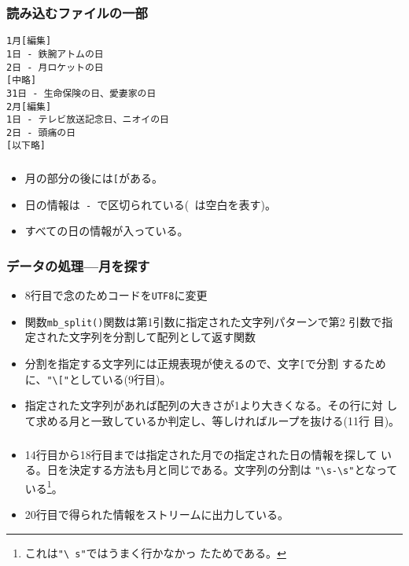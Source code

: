 \begin{frame}[containsverbatim]
\frametitle{読み込むファイルの一部}
\begin{Verbatim}
1月[編集]
1日 - 鉄腕アトムの日
2日 - 月ロケットの日
[中略]
31日 - 生命保険の日、愛妻家の日
2月[編集]
1日 - テレビ放送記念日、ニオイの日
2日 - 頭痛の日
[以下略]
\end{Verbatim}
\end{frame}
\begin{frame}[containsverbatim]
\frametitle{}
\begin{itemize}
 \item 月の部分の後には\texttt{[}がある。
 \item 日の情報は\verb*+ - +で区切られている(\verb*+ +は空白を表す)。
 \item すべての日の情報が入っている。
\end{itemize}
\end{frame}
\begin{frame}[containsverbatim]
\frametitle{データの処理---月を探す}
\begin{itemize}
 \item 8行目で念のためコードを\texttt{UTF8}に変更
 \item 関数\Verb+mb_split()+関数は第1引数に指定された文字列パターンで第2
       引数で指定された文字列を分割して配列として返す関数
 \item 分割を指定する文字列には正規表現が使えるので、文字\Verb+[+で分割
       するために、\Verb+"\["+としている(9行目)。
 \item 指定された文字列があれば配列の大きさが1より大きくなる。その行に対
       して求める月と一致しているか判定し、等しければループを抜ける(11行
       目)。
\end{itemize}
\end{frame}
\begin{frame}[containsverbatim]
\frametitle{}
\begin{itemize}
 \item 14行目から18行目までは指定された月での指定された日の情報を探して
       いる。日を決定する方法も月と同じである。文字列の分割は
       \verb+"\s-\s"+となっている\footnote{これは\texttt{"\textbackslash
       s"}ではうまく行かなかっ
       たためである。}。
 \item 20行目で得られた情報をストリームに出力している。
\end{itemize}
\end{frame}

